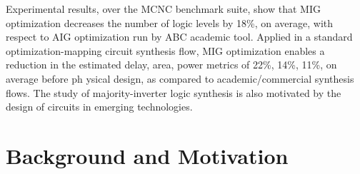 \documentclass[
	accentcolor=1c,%
	type=intern,
	marginpar=false,
	ruledheaders=section,
	class=report,
	BCOR=5mm,
      parskip=half-,
	fontsize=10pt
	]{tudapub}
\begin{document}
{\newline                                                                                                                                          
Experimental results, over the MCNC benchmark suite, show that MIG optimization decreases the 
number of logic levels by 18\%, on average, with respect to AIG optimization run by ABC academic 
tool. Applied in a standard optimization-mapping circuit synthesis flow, MIG optimization enables 
a reduction in the estimated {delay, area, power} metrics of {22\%, 14\%, 11\%},  on average before ph
ysical design, as compared to academic/commercial synthesis flows. The study of majority-inverter
logic synthesis is also motivated by the design of circuits in emerging technologies. 
}

\newpage
\section*{Background and Motivation}
\end{document}
